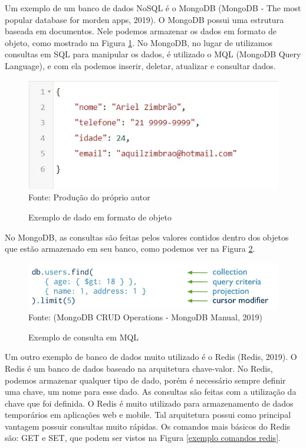 \documentclass[
	12pt,				%
	openright,			%
	oneside,			%
	a4paper,			%
	chapter=TITLE,		%
	section=TITLE,		%
	subsection=TITLE,	%
	subsubsection=TITLE,%
	english,			%
	brazil				%
	]{abntex2}
\theoremstyle{definition}
\begin{document}
    Um exemplo de um banco de dados NoSQL é o MongoDB (MongoDB - The most popular
    database for morden apps, 2019). O MongoDB possui uma estrutura baseada em documentos. Nele podemos armazenar os dados em formato de objeto, como mostrado na Figura \ref{exemplo objeto}. No MongoDB, no lugar de utilizamos consultas em SQL para manipular os dados, é utilizado o MQL (MongoDB Query Language), e com ela podemos inserir, deletar, atualizar e consultar dados. 
    
    \begin{figure}[H]
         \centering
         \caption{Exemplo de dado em formato de objeto}
         \includegraphics[scale=1]{imagens/objeto.JPG}
         \\{\footnotesize Fonte: Produção do próprio autor}
         \label{exemplo objeto}
    \end{figure}
    
    No MongoDB, as consultas são feitas pelos valores contidos dentro dos objetos que estão armazenado em seu banco, como podemos ver na Figura \ref{exemplo query mongo}.
    
    \begin{figure}[H]
         \centering
         \caption{Exemplo de consulta em MQL}
         \includegraphics[scale=1]{imagens/mongo-query-exemplo.JPG}
         \\{\footnotesize Fonte: (MongoDB CRUD Operations - MongoDB Manual, 2019)}
         \label{exemplo query mongo}
    \end{figure}
    
    Um outro exemplo de banco de dados muito utilizado é o Redis (Redis, 2019). O Redis é um banco de dados baseado na arquitetura chave-valor. No Redis, podemos armazenar qualquer tipo de dado, porém é necessário sempre definir uma chave, um nome para esse dado. As consultas são feitas com a utilização da chave que foi definida. O Redis é muito utilizado para armazenamento de dados temporários em aplicações web e mobile. Tal arquitetura possui como principal vantagem possuir consultas muito rápidas. Os comandos mais básicos do Redis são: GET e SET, que podem ser vistos na Figura \ref{exemplo comandos redis}.
    
\end{document}
